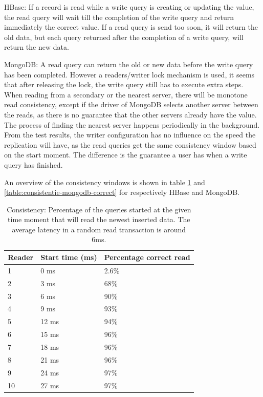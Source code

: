 \documentclass[final,5p,times]{elsarticle}
\begin{document}
HBase: If a record is read while a write query is creating or updating the value, the read query will wait till the completion of the write query and return immediately the correct value. If a read query is send too soon, it will return the old data, but each query returned after the completion of a write query, will return the new data. 

MongoDB: A read query can return the old or new data before the write query has been completed. However a readers/writer lock mechanism is used, it seems that after releasing the lock, the write query still has to execute extra steps. When reading from a secondary or the nearest server, there will be monotone read consistency, except if the driver of MongoDB selects another server between the reads, as there is no guarantee that the other servers already have the value. The process of finding the nearest server happens periodically in the background. \\
From the test results, the writer configuration has no influence on the speed the replication will have, as the read queries get the same consistency window based on the start moment. The difference is the guarantee a user has when a write query has finished. 

An overview of the consistency windows is shown in table \ref{table:consistentie-hbase-correct} and \ref{table:consistentie-mongodb-correct} for respectively HBase and MongoDB. 

\begin{table}
\centering
\begin{tabular}{l| l l}
	\textbf{Reader} & \textbf{Start time (ms)} & \textbf{Percentage correct read} \\
	\hline
	1 &  0 ms & 2.6\%\\
	2 &  3 ms & 68\%\\
	3 &  6 ms & 90\%\\
	4 &  9 ms & 93\%\\
	5 &  12 ms & 94\%\\
	6 &  15 ms & 96\%\\
	7 &  18 ms & 96\%\\
	8 &  21 ms & 96\%\\
	9 &  24 ms & 97\%\\
	10 & 27 ms & 97\% 
\end{tabular}
\caption{Consistency: Percentage of the queries started at the given time moment that will read the newest inserted data. The average latency in a random read transaction is around 6ms.}
\label{table:consistentie-hbase-correct}
\end{table}
\end{document}
